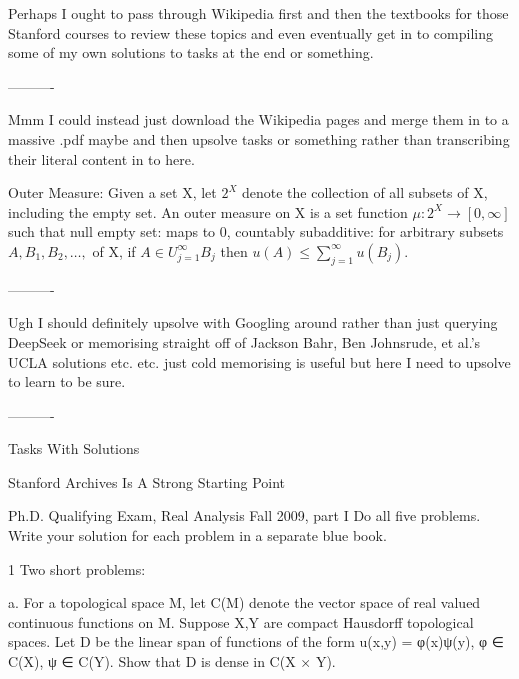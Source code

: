 Perhaps I ought to pass through Wikipedia first and then the textbooks for those Stanford courses to review these topics and even eventually get in to compiling some of my own solutions to tasks at the end or something.

----------

Mmm I could instead just download the Wikipedia pages and merge them in to a massive .pdf maybe and then upsolve tasks or something rather than transcribing their literal content in to here.

Outer Measure: Given a set X, let $2^X$ denote the collection of all subsets of X, including the empty set. An outer measure on X is a set function $\mu: 2^X \to [0,\infty]$ such that null empty set: maps to $0$, countably subadditive: for arbitrary subsets $A, B_1, B_2,\dots,$ of X, if $A \in U_{j=1}^{\infty} B_j$ then $u(A) \le \sum_{j=1}^{\infty} u(B_j)$.

----------

Ugh I should definitely upsolve with Googling around rather than just querying DeepSeek or memorising straight off of Jackson Bahr, Ben Johnsrude, et al.'s UCLA solutions etc. etc. just cold memorising is useful but here I need to upsolve to learn to be sure.

----------

Tasks With Solutions

Stanford Archives Is A Strong Starting Point

Ph.D. Qualifying Exam, Real Analysis
Fall 2009, part I
Do all five problems. Write your solution for each problem in a separate blue book.

1 Two short problems:

a. For a topological space M, let C(M) denote the vector space of real valued continuous functions on M. Suppose X,Y are compact Hausdorff topological spaces. Let D be the linear span of functions of the form u(x,y) = φ(x)ψ(y), φ ∈ C(X), ψ ∈ C(Y). Show that D is dense in C(X × Y).

